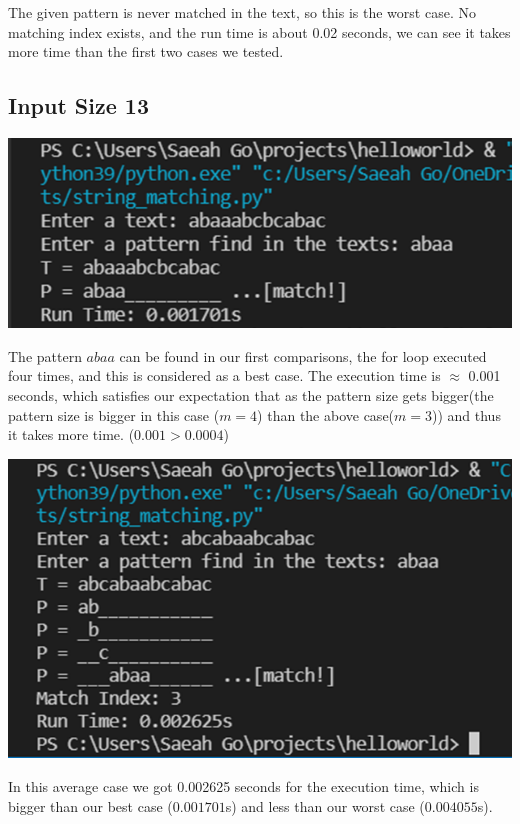 \documentclass{article}
\begin{document}
The given pattern is never matched in the text, so this is the worst case. No matching index exists, and the run time is about 0.02 seconds, we can see it takes more time than the first two cases we tested.

\subsection{\textbf{Input Size 13}} 
\begin{center}
\includegraphics[scale = 0.7]{inputsize 13 best.png} \\
\end{center}
The pattern $abaa$ can be found in our first comparisons, the for loop executed four times, and this is considered as a best case. The execution time is $\approx$ 0.001 seconds, which satisfies our expectation that as the pattern size gets bigger(the pattern size is bigger in this case ($m=4$) than the above case($m=3$)) and thus it takes more time. ($0.001 > 0.0004$)
\begin{center}
\includegraphics[scale = 0.7]{inputsize 13 average.png} \\
\end{center}
In this average case we got 0.002625 seconds for the execution time, which is bigger than our best case ($0.001701$s) and less than our worst case ($0.004055$s). 
\end{document}
